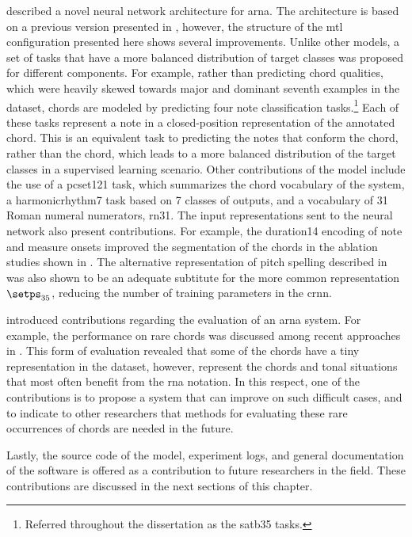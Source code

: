  described a novel neural network
architecture for \gls{arna}. The architecture is based on a
previous version presented in
\textcite{napoleslopez2021augmentednet}, however, the
structure of the \gls{mtl} configuration presented here
shows several improvements. Unlike other models, a set of
tasks that have a more balanced distribution of target
classes was proposed for different components. For example,
rather than predicting chord qualities, which were heavily
skewed towards major and dominant seventh examples in the
dataset, chords are modeled by predicting four note
classification tasks.\footnote{Referred throughout the
dissertation as the \gls{satb35} tasks.} Each of these tasks
represent a note in a \gls{closed-position} representation
of the annotated chord. This is an equivalent task to
predicting the notes that conform the chord, rather than the
chord, which leads to a more balanced distribution of the
target classes in a supervised learning scenario. Other
contributions of the model include the use of a
\gls{pcset121} task, which summarizes the chord vocabulary
of the system, a \gls{harmonicrhythm7} task based on 7
classes of outputs, and a vocabulary of 31 Roman numeral
numerators, \gls{rn31}. The input representations sent to
the neural network also present contributions. For example,
the \gls{duration14} encoding of note and measure onsets
improved the segmentation of the chords in the ablation
studies shown in .
The alternative representation of pitch spelling described
in  was also shown
to be an adequate subtitute for the more common
representation $\setps_{35}$, reducing the number of
training parameters in the \gls{crnn}.

 introduced contributions
regarding the evaluation of an \gls{arna} system. For
example, the performance on rare chords was discussed among
recent approaches in . This
form of evaluation revealed that some of the chords have a
tiny representation in the dataset, however, represent the
chords and tonal situations that most often benefit from the
\gls{rna} notation. In this respect, one of the
contributions is to propose a system that can improve on
such difficult cases, and to indicate to other researchers
that methods for evaluating these rare occurrences of chords
are needed in the future.

Lastly, the source code of the model, experiment logs, and
general documentation of the software is offered as a
contribution to future researchers in the field. These
contributions are discussed in the next sections of this
chapter.
